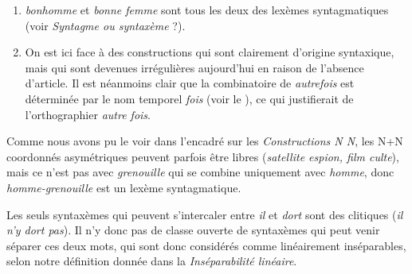 {\begin{enumerate}[label=\alph*.]
    \item \textit{bonhomme} et \textit{bonne femme} sont tous les deux des lexèmes syntagmatiques (voir  \textit{Syntagme ou syntaxème} ?).

    \item On est ici face à des constructions qui sont clairement d’origine syntaxique, mais qui sont devenues irrégulières aujourd’hui en raison de l’absence d’article. Il est néanmoins clair que la combinatoire de \textit{autrefois} est déterminée par le nom temporel \textit{fois} (voir le ), ce qui justifierait de l’orthographier \textit{autre fois}.
    \end{enumerate}

     Comme nous avons pu le voir dans l'encadré  sur les \textit{Constructions N N}, les N+N coordonnés asymétriques peuvent parfois être libres (\textit{satellite espion, film culte}), mais ce n'est pas avec \textit{grenouille} qui se combine uniquement avec \textit{homme}, donc \textit{homme-grenouille} est un lexème syntagmatique.

     Les seuls syntaxèmes qui peuvent s’intercaler entre \textit{il} et \textit{dort} sont des clitiques (\textit{il n’y dort pas}). Il n’y donc pas de classe ouverte de syntaxèmes qui peut venir séparer ces deux mots, qui sont donc considérés comme linéairement inséparables, selon notre définition donnée dans la  \textit{Inséparabilité linéaire}.
}
